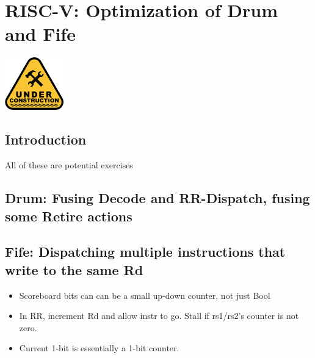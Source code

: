 

\chapter{RISC-V: Optimization of Drum and Fife}


\setcounter{page}{1}
\renewcommand{\thepage}{\arabic{chapter}-\arabic{page}}

\label{ch_Optimization}


\vspace{2ex}

\centerline{\includegraphics[width=1in,angle=0]{Figures/Fig_Under_Construction}}

\vspace{2ex}

\section{Introduction}

All of these are potential exercises


\section{Drum: Fusing Decode and RR-Dispatch, fusing some Retire actions}


\section{Fife: Dispatching multiple instructions that write to the same Rd}

\begin{itemize}
 \item Scoreboard bits can can be a small up-down counter, not just Bool
 \item In RR, increment Rd and allow instr to go. Stall if rs1/rs2's counter is not zero.
 \item Current 1-bit is essentially a 1-bit counter.
\end{itemize}

